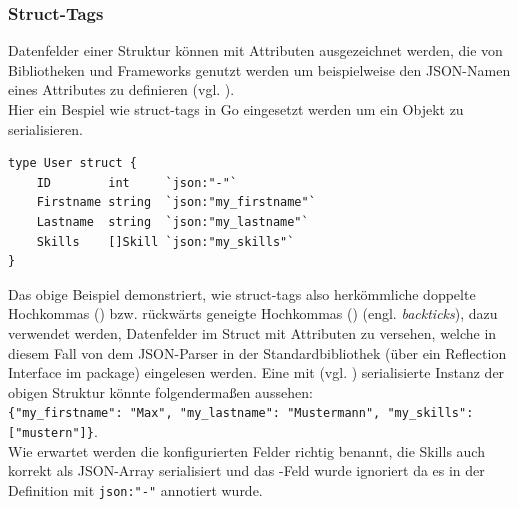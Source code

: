 \newpage
\subsubsection{Struct-Tags}
Datenfelder einer Struktur können mit Attributen ausgezeichnet werden, die von Bibliotheken und Frameworks genutzt werden um beispielweise den JSON-Namen eines Attributes zu definieren (vgl. \cite{go:spec:structs}).\\
Hier ein Bespiel wie \frqq{}struct-tags\flqq{} in Go eingesetzt werden um ein Objekt zu serialisieren.
\begin{lstlisting}[style=goRaw,caption={\centering Objekt \textit{User}, welches mit struct-tags annotiert wurde um die JSON-Serialisierung zu konfigurieren.}]
type User struct {
    ID        int     `json:"-"`
    Firstname string  `json:"my_firstname"`
    Lastname  string  `json:"my_lastname"`
    Skills    []Skill `json:"my_skills"`
}
\end{lstlisting}
Das obige Beispiel demonstriert, wie \frqq{}struct-tags\flqq{} also herkömmliche doppelte Hochkommas () bzw. rückwärts geneigte Hochkommas (\mono{\`{}}) (engl. \textit{backticks}), dazu verwendet werden, Datenfelder im Struct mit Attributen zu versehen, welche in diesem Fall von dem JSON-Parser in der Standardbibliothek (über ein Reflection Interface im \frqq{}\flqq{} package) eingelesen werden. Eine mit \frqq{}\frqq{} (vgl. \cite{go:pkg:json:marshal}) serialisierte Instanz der obigen Struktur könnte folgendermaßen aussehen:\\
\verb|{"my_firstname": "Max", "my_lastname": "Mustermann", "my_skills": ["mustern"]}|.\\
Wie erwartet werden die konfigurierten Felder richtig benannt, die \frqq{}Skills\frqq{} auch korrekt als JSON-Array serialisiert und das -Feld wurde ignoriert da es in der Definition mit \verb|json:"-"| annotiert wurde. 

